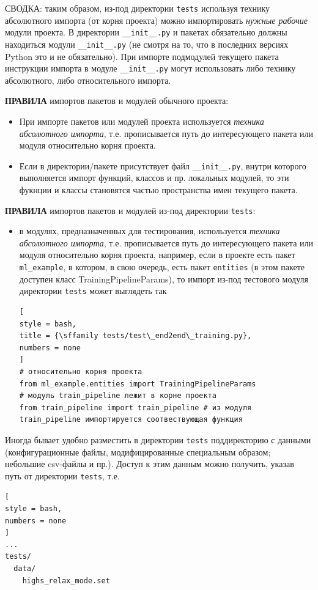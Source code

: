 \documentclass[%
	11pt,
	a4paper,
	utf8,
		]{article}
\begin{document}
СВОДКА: таким образом, из-под директории \texttt{tests} используя технику абсолютного импорта (от корня проекта) можно импортировать \emph{нужные рабочие} модули проекта. В директории \verb|__init__.py| и пакетах обязательно должны находиться модули \verb|__init__.py| (не смотря на то, что в последних версиях Python это и не обязательно). При импорте подмодулей текущего пакета инструкции импорта в модуле \verb|__init__.py| могут использовать либо технику абсолютного, либо относительного импорта.

\textbf{ПРАВИЛА} импортов пакетов и модулей обычного проекта:
\begin{itemize}
	\item При импорте пакетов или модулей проекта используется \emph{техника абсолютного импорта}, т.е. прописывается путь до интересующего пакета или модуля относительно корня проекта.
	
	\item Если в директории/пакете присутствует файл \verb|__init__.py|, внутри которого выполняется импорт функций, классов и пр. локальных модулей, то эти фукнции и классы становятся частью пространства имен текущего пакета.
\end{itemize}

\textbf{ПРАВИЛА} импортов пакетов и модулей из-под директории \texttt{tests}:
\begin{itemize}
	\item в модулях, предназначенных для тестирования, используется \emph{техника абсолютного импорта}, т.е. прописывается путь до интересующего пакета или модуля относительно корня проекта, например, если в проекте есть пакет \texttt{ml\_example}, в котором, в свою очередь, есть пакет \texttt{entities} (в этом пакете доступен класс TrainingPipelineParams), то импорт из-под тестового модуля директории \texttt{tests} может выглядеть так
\begin{lstlisting}[
style = bash,
title = {\sffamily tests/test\_end2end\_training.py},
numbers = none	
]
# относительно корня проекта
from ml_example.entities import TrainingPipelineParams
# модуль train_pipeline лежит в корне проекта
from train_pipeline import train_pipeline # из модуля train_pipeline импортируется соотвествующая функция
\end{lstlisting}
\end{itemize}

Иногда бывает удобно разместить в директории \texttt{tests} поддиректорию с данными (конфигурационные файлы, модифицированные специальным образом; небольшие csv-файлы и пр.). Доступ к этим данным можно получить, указав путь от директории \texttt{tests}, т.е.
\begin{lstlisting}[
style = bash,
numbers = none
]
...
tests/
  data/
    highs_relax_mode.set
\end{lstlisting}
\end{document}

